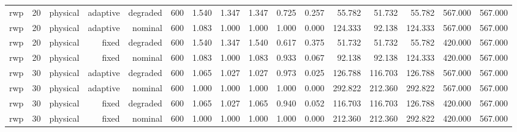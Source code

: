 \begin{tabular}{lrrrrrrrrrrrrrrr}
rwp & 20 & physical & adaptive & degraded & 600 & 1.540 & 1.347 & 1.347 & 0.725 & 0.257 & 55.782 & 51.732 & 55.782 & 567.000 & 567.000 \\
rwp & 20 & physical & adaptive & nominal & 600 & 1.083 & 1.000 & 1.000 & 1.000 & 0.000 & 124.333 & 92.138 & 124.333 & 567.000 & 567.000 \\
rwp & 20 & physical & fixed & degraded & 600 & 1.540 & 1.347 & 1.540 & 0.617 & 0.375 & 51.732 & 51.732 & 55.782 & 420.000 & 567.000 \\
rwp & 20 & physical & fixed & nominal & 600 & 1.083 & 1.000 & 1.083 & 0.933 & 0.067 & 92.138 & 92.138 & 124.333 & 420.000 & 567.000 \\
rwp & 30 & physical & adaptive & degraded & 600 & 1.065 & 1.027 & 1.027 & 0.973 & 0.025 & 126.788 & 116.703 & 126.788 & 567.000 & 567.000 \\
rwp & 30 & physical & adaptive & nominal & 600 & 1.000 & 1.000 & 1.000 & 1.000 & 0.000 & 292.822 & 212.360 & 292.822 & 567.000 & 567.000 \\
rwp & 30 & physical & fixed & degraded & 600 & 1.065 & 1.027 & 1.065 & 0.940 & 0.052 & 116.703 & 116.703 & 126.788 & 420.000 & 567.000 \\
rwp & 30 & physical & fixed & nominal & 600 & 1.000 & 1.000 & 1.000 & 1.000 & 0.000 & 212.360 & 212.360 & 292.822 & 420.000 & 567.000 \\
\bottomrule
\end{tabular}